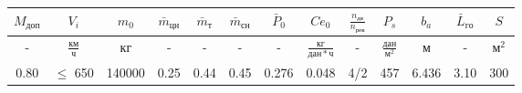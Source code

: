 \begin{tabular}{|c|c|c|c|c|c|c|c|c|c|c|c|c|}
\hline
$M_{доп}$ & $V_{i}$ & $m_0$ & $\bar{m}_{цн}$ & $\bar{m}_т$ & $\bar{m}_{сн}$ & $\bar{P}_0$ & $Ce_0$ & $\frac{n_{дв}}{n_{рев}}$ & $P_s$ & $b_a$ & $\bar{L}_{го}$ & $S$ \\ 
\hline
- & $\frac{км}{ч}$ & кг & - & - & - & - & $\frac{кг}{дан \ast ч}$ & - & $\frac{дан}{м^2}$ & м & - & $м^2$ \\ 
\hline
0.80 & $\le$ 650 & 140000 & 0.25 & 0.44 & 0.45 & 0.276 & 0.048 & 4/2 & 457 & 6.436 & 3.10 & 300 \\ 
\hline
\end{tabular}